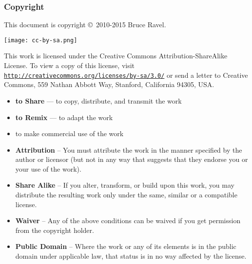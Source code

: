 
\begin{frame}
  \frametitle{Copyright}
  \tiny

  This document is copyright \copyright\ 2010-2015 Bruce Ravel.

  \begin{center}
    \texttt{[image: cc-by-sa.png]}
  \end{center}

  This work is licensed under the Creative Commons
  Attribution-ShareAlike License.  To view a copy of this license,
  visit \href{http://creativecommons.org/licenses/by-sa/3.0/}
  {\color{Purple2}\texttt{http://creativecommons.org/licenses/by-sa/3.0/}}
  or send a letter to Creative Commons, 559 Nathan Abbott Way,
  Stanford, California 94305, USA.

  \begin{description}
  \tiny
  \item[You are free:] %
    \begin{itemize}
      \tiny
    \item \textbf{to Share} --- to copy, distribute, and transmit the work
    \item \textbf{to Remix} --- to adapt the work
    \item to make commercial use of the work
    \end{itemize}
  \item[Under the following conditions:] %
    \begin{itemize}
      \tiny
    \item \textbf{Attribution} -- You must attribute the work in the manner
      specified by the author or licensor (but not in any way that
      suggests that they endorse you or your use of the work).
    \item \textbf{Share Alike} -- If you alter, transform, or build upon this
      work, you may distribute the resulting work only under the same,
      similar or a compatible license.
    \end{itemize}
  \item[With the understanidng that:] 
    \begin{itemize}
      \tiny
    \item \textbf{Waiver} -- Any of the above conditions can be waived
      if you get permission from the copyright holder.
    \item \textbf{Public Domain} -- Where the work or any of its
      elements is in the public domain under applicable law, that
      status is in no way affected by the license.

\end{itemize}
\end{description}
\end{frame}
